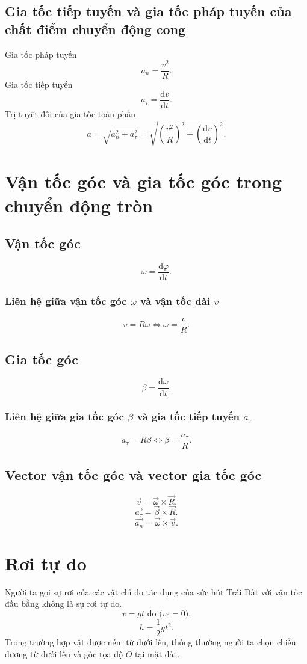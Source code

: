 \subsection{Gia tốc tiếp tuyến và gia tốc pháp tuyến của chất điểm chuyển động cong}
Gia tốc pháp tuyến
$$a_n = \frac{v^2}{R}.$$
Gia tốc tiếp tuyến
$$a_\tau = \frac{\mathrm{d}v}{\mathrm{d}t}.$$
Trị tuyệt đối của gia tốc toàn phần
$$a = \sqrt{{a_n^2} + {a_\tau^2}} = \sqrt{\left( {\frac{v^2}{R}} \right)^2 + \left( {\frac{\mathrm{d}v}{\mathrm{d}t}} \right)^2}.$$
\section{Vận tốc góc và gia tốc góc trong chuyển động tròn}
\subsection{Vận tốc góc}
$$\omega = \frac{\mathrm{d}\varphi}{\mathrm{d}t}.$$
\subsubsection{Liên hệ giữa vận tốc góc $\omega$ và vận tốc dài $v$}
$$v = R \omega \Leftrightarrow \omega = \frac{v}{R}.$$
\subsection{Gia tốc góc}
$$\beta = \frac{\mathrm{d}\omega}{\mathrm{d}t}.$$
\subsubsection{Liên hệ giữa gia tốc góc $\beta$ và gia tốc tiếp tuyến $a_\tau$}
$$a_\tau = R\beta \Leftrightarrow \beta = \frac{a_\tau}{R}.$$
\subsection{Vector vận tốc góc và vector gia tốc góc}
$$\overrightarrow v  = \overrightarrow \omega   \times \overrightarrow R .$$
$$\overrightarrow {{a_\tau }}  = \overrightarrow \beta   \times \overrightarrow R .$$
$$\overrightarrow {{a_n}}  = \overrightarrow \omega   \times \overrightarrow v .$$
\section{Rơi tự do}
Người ta gọi sự rơi của các vật chỉ do tác dụng của sức hút Trái Đất với vận tốc đầu bằng không là sự rơi tự do.
$$ v = gt \text{ do (} v_0 = 0 \text{)}.$$
$$ h = \frac{1}{2}gt^2.$$
Trong trường hợp vật được ném từ dưới lên, thông thường người ta chọn chiều dương từ dưới lên và gốc tọa độ $O$ tại mặt đất.

